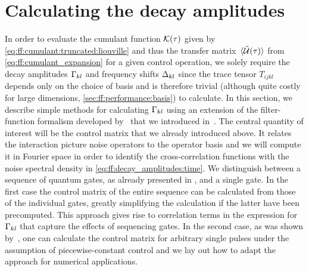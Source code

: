 
\section{Calculating the decay amplitudes}\label{sec:ff:theory:decay_amplitudes}
In order to evaluate the cumulant function $\mathcal{K}(\tau)$ given by \cref{eq:ff:cumulant:truncated:liouville} and thus the transfer matrix $\ev*{\liouvUe(\tau)}$ from \cref{eq:ff:cumulant_expansion} for a given control operation, we solely require the decay amplitudes $\Gamma_{kl}$ and frequency shifts $\Delta_{kl}$ since the trace tensor $T_{ijkl}$ depends only on the choice of basis and is therefore trivial (although quite costly for large dimensions, \cf \cref{sec:ff:performance:basis}) to calculate.
In this section, we describe simple methods for calculating $\Gamma_{kl}$ using an extension of the filter-function formalism developed by~\citet{Green2013} that we introduced in~.
The central quantity of interest will be the control matrix that we already introduced above.
It relates the interaction picture noise operators to the operator basis and we will compute it in Fourier space in order to identify the cross-correlation functions with the noise spectral density in \cref{eq:ff:decay_amplitudes:time}.
We distinguish between a sequence of quantum gates, as already presented in , and a single gate.
In the first case the control matrix of the entire sequence can be calculated from those of the individual gates, greatly simplifying the calculation if the latter have been precomputed.
This approach gives rise to correlation terms in the expression for $\Gamma_{kl}$ that capture the effects of sequencing gates.
In the second case, as was shown by~\citet{Green2013}, one can calculate the control matrix for arbitrary single pulses under the assumption of piecewise-constant control and we lay out how to adapt the approach for numerical applications.

